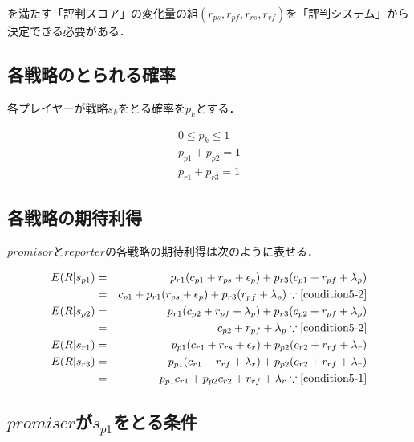 を満たす「評判スコア」の変化量の組$(r_{ps}, r_{pf}, r_{rs}, r_{rf})$を「評判システム」から決定できる必要がある．

\subsection{各戦略のとられる確率}
各プレイヤーが戦略$s_{k}$をとる確率を$p_{k}$とする．

\begin{gather}
  0 \leq p_{k} \leq 1 \nonumber \\
  p_{p1} + p_{p2} = 1 \label{condition5-1} \\
  p_{r1} + p_{r3} = 1 \label{condition5-2}
\end{gather}

\subsection{各戦略の期待利得}
$promisor$と$reporter$の各戦略の期待利得は次のように表せる．

\begin{eqnarray}
  E(R|s_{p1}) &=& p_{r1} (c_{p1} + r_{ps} + \epsilon_p) + p_{r3} (c_{p1} + r_{pf} + \lambda_p) \nonumber \\
              &=& c_{p1} + p_{r1} (r_{ps} + \epsilon_p) + p_{r3} (r_{pf} + \lambda_p) \because\eqref{condition5-2} \\
  E(R|s_{p2}) &=& p_{r1} (c_{p2} + r_{pf} + \lambda_p) + p_{r3} (c_{p2} + r_{pf} + \lambda_p) \nonumber \\
              &=& c_{p2} + r_{pf} + \lambda_p  \because\eqref{condition5-2} \\
  E(R|s_{r1}) &=& p_{p1} (c_{r1} + r_{rs} + \epsilon_r) + p_{p2} (c_{r2} + r_{rf} + \lambda_r) \\
  E(R|s_{r3}) &=& p_{p1} (c_{r1} + r_{rf} + \lambda_r) + p_{p2} (c_{r2} + r_{rf} + \lambda_r) \nonumber \\
              &=& p_{p1} c_{r1} + p_{p2} c_{r2} + r_{rf} + \lambda_r \because\eqref{condition5-1}
\end{eqnarray}

\subsection{$promiser$が$s_{p1}$をとる条件}

